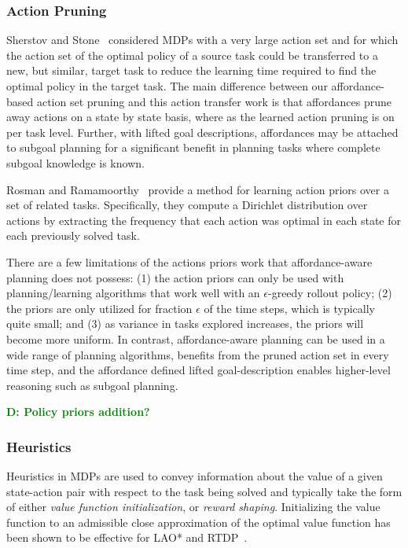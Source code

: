 \documentclass[conference]{IEEEtran}
\newcommand{\dnote}[1]{\textcolor{Green}{\textbf{D: #1}}}
\begin{document}
\subsubsection{Action Pruning}

Sherstov and Stone~\cite{sherstov2005improving} considered MDPs with a very large 
action set and for which the action set of the optimal policy of a source task could be 
transferred to a new, but similar, target task to reduce the learning time required to find
the optimal policy in the target task. The main difference between our affordance-based 
action set pruning and this action transfer work is that affordances prune away actions on 
a state by state basis, where as the learned action pruning is on per task level. Further, 
with lifted goal descriptions, affordances may be attached to subgoal planning for a significant
benefit in planning tasks where complete subgoal knowledge is known.

Rosman and Ramamoorthy~\cite{rosman2012good} provide a method for learning action
priors over a set of related tasks. Specifically, they compute a Dirichlet distribution over 
actions by extracting the frequency that each action was optimal in each state for each 
previously solved task.

There are a few limitations of the actions priors work that affordance-aware planning
does not possess: (1) the action priors can only be used with planning/learning algorithms
that work well with an $\epsilon$-greedy rollout policy; (2) the priors are only utilized for 
fraction $\epsilon$ of the time steps, which is typically quite small; and (3) as variance in
tasks explored increases, the priors will become more uniform. In contrast, affordance-aware
planning can be used in a wide range of planning algorithms, benefits from the pruned action
set in every time step, and the affordance defined lifted goal-description enables higher-level 
reasoning such as subgoal planning.

\dnote{Policy priors addition?}

\subsubsection{Heuristics}
Heuristics in MDPs are used to convey information about the value of a given state-action pair with respect to the task being solved and typically take the form of either {\em value function initialization},
or {\em reward shaping}. Initializing the value function to an admissible close approximation of the optimal value function has been shown to be effective for LAO* and RTDP~\cite{Hansen:1999qf}.
\end{document}
